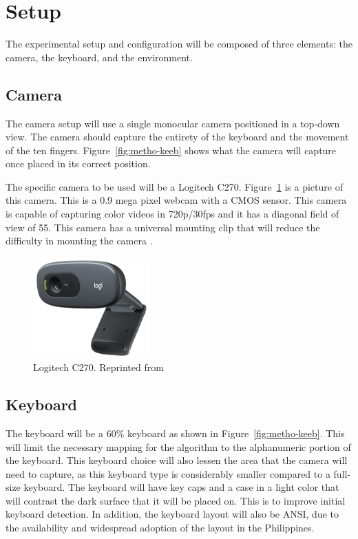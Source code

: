 \documentclass{report}
\begin{document}
\section{Setup}
\label{section:metho-setup}

The experimental setup and configuration will be composed of three elements: the
camera, the keyboard, and the environment.

\subsection{Camera}
The camera setup will use a single monocular camera positioned in a top-down
view. The camera should capture the entirety of the keyboard and the movement of
the ten fingers. Figure~\ref{fig:metho-keeb} shows what the camera will capture
once placed in its correct position.

The specific camera to be used will be a Logitech C270.
Figure~\ref{fig:metho-cam} is a picture of this camera. This is a 0.9 mega pixel
webcam with a CMOS sensor. This camera is capable of capturing color videos in
720p/30fps and it has a diagonal field of view of 55\degree. This camera has a
universal mounting clip that will reduce the difficulty in mounting the camera
\parencite{logitech}.

\begin{figure}[H]
	\centering
	\includegraphics[width=0.4\textwidth]{webcam.png}
	\caption{Logitech C270. Reprinted from }
	\label{fig:metho-cam}
	\centering
\end{figure}

\subsection{Keyboard}
\label{section:metho-keeb}
The keyboard will be a 60\% keyboard as shown in Figure~\ref{fig:metho-keeb}.
This will limit the necessary mapping for the algorithm to the alphanumeric
portion of the keyboard. This keyboard choice will also lessen the area that the
camera will need to capture, as this keyboard type is considerably smaller
compared to a full-size keyboard. The keyboard will have key caps and a case in
a light color that will contrast the dark surface that it will be placed on.
This is to improve initial keyboard detection. In addition, the keyboard layout
will also be ANSI, due to the availability and widespread adoption of the layout
in the Philippines.
\end{document}
